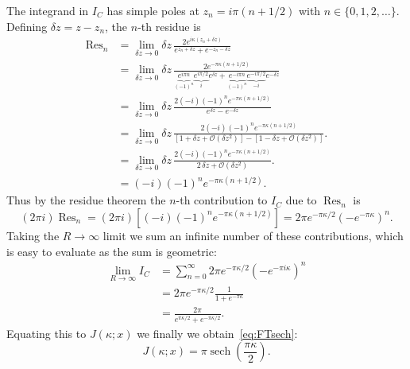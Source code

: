 \documentclass[11pt,a4paper]{article}
\DeclareMathOperator{\sech}{sech}
\DeclareMathOperator{\Res}{Res}
\begin{document}
The integrand in $I_C$ has simple poles at $z_n = i\pi(n+1/2)$ with $n\in\{0,1,2,\ldots\}$. Defining $\delta z = z-z_n$, the $n$-th residue is
\begin{align*}
\Res_n  &= \lim_{\delta z\to 0} \delta z \, \frac{2e^{i\kappa (z_n+\delta z)}}{e^{z_n + \delta z}+e^{-z_n -\delta z}}						\\
			&=  \lim_{\delta z\to 0} \delta z \, 
					\frac{  2e^{-\pi\kappa (n+1/2)}  }{  \underbrace{e^{i\pi n}}_{(-1)^n} \underbrace{e^{i\pi/2}}_i e^{\delta z}
							+\underbrace{e^{-i\pi n}}_{(-1)^n}\underbrace{e^{-i\pi/2}}_{-i} e^{-\delta z}  } 									\\
			&= \lim_{\delta z\to 0} \delta z \, \frac{  2(-i)(-1)^n e^{-\pi\kappa (n+1/2)}  }{  e^{\delta z} - e^{-\delta z}  }						\\
			&= \lim_{\delta z\to 0} \delta z \, 
					\frac{  2(-i)(-1)^n  e^{-\pi\kappa (n+1/2)}  }{  [1+\delta z + \mathcal{O}(\delta z^2)] - [1-\delta z+\mathcal{O}(\delta z^2)]  }.  \\
			&= \lim_{\delta z\to 0} \delta z \, 
					\frac{  2(-i)(-1)^n  e^{-\pi\kappa (n+1/2)}  }  {  2 \, \delta z + \mathcal{O}(\delta z^2)  }.  											\\
			&=   (-i)(-1)^n e^{-\pi\kappa (n+1/2)}  .
\end{align*}
Thus by the residue theorem the $n$-th contribution to $I_C$ due to $\Res_n$ is
\begin{equation*}
	(2\pi i) \Res_n = (2\pi i) \left[  (-i)(-1)^n e^{-\pi\kappa (n+1/2)}  \right] =  2\pi e^{-\pi\kappa /2} \left(-e^{-\pi\kappa } \right)^n.
\end{equation*}
Taking the $R\to\infty$ limit we sum an infinite number of these contributions, which is easy to evaluate as the sum is geometric:
\begin{align*}
\lim_{R\to\infty}I_C &= \sum_{n=0}^\infty  2\pi e^{-\pi\kappa/2} \left(-e^{-\pi i\kappa } \right)^n 		\\
	 						 &= 2\pi e^{-\pi\kappa/2} \frac{1}{1+e^{-\pi\kappa}}										\\
						  	 &= \frac{2\pi}{ e^{\pi \kappa/2} + e^{-\pi \kappa/2}}.
\end{align*} 
Equating this to $J(\kappa ; x)$ we finally we obtain~\eqref{eq:FTsech}:
\begin{equation*}
J(\kappa ; x) = \pi \sech\left( \frac{\pi \kappa}{2} \right).
\end{equation*}
\end{document}

